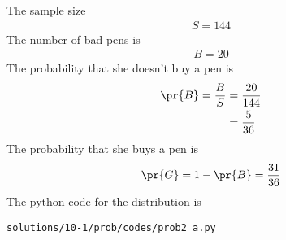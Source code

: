 The sample size 
\begin{align}
S=144
\end{align}
The number of bad pens is 
\begin{align}
B=20
\end{align}
The probability that she doesn't buy a pen is 
\begin{align}
\pr{B} = \frac{B}{S} &= \frac{20}{144}
\\
&= \frac{5}{36}
\end{align}
The probability that she buys a pen is 
\begin{align}
\pr{G} = 1-\pr{B} = \frac{31}{36}
\end{align}
The python code for the distribution is
\begin{lstlisting}
solutions/10-1/prob/codes/prob2_a.py
\end{lstlisting}
